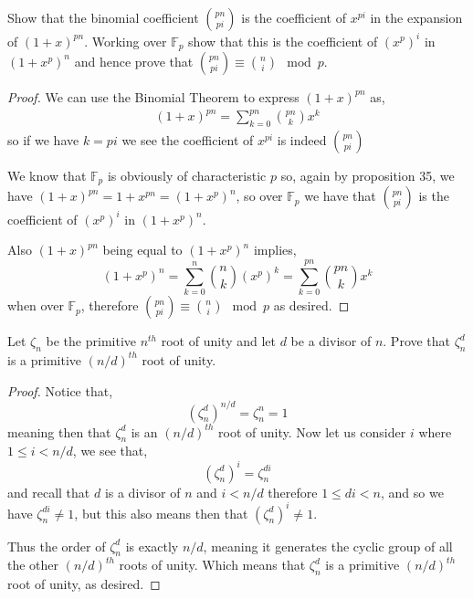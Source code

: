 \documentclass[11pt]{article}
\newenvironment{problem}[2][Problem\!]{\begin{trivlist}
\item[\hskip \labelsep {\bfseries #1}\hskip \labelsep {\bfseries #2}]}{\end{trivlist}}
\newcommand{\ff}{\mathbb F}   %
\renewcommand{\leq}{\leqslant}
\begin{document}
\newpage
\begin{tcolorbox}
    \begin{problem}{13.5.9}
        Show that the binomial coefficient $\binom{pn}{pi}$ is the coefficient of $x^{pi}$ in the expansion of $(1 + x)^{pn}$. Working over $\mathbb{F}_p$ show that this is the coefficient of $(x^{p})^{i}$ in $(1 + x^{p})^{n}$ and hence prove that $\binom{pn}{pi}\equiv \binom{n}{i} \mod{p}$. 
    \end{problem}
\end{tcolorbox}
\begin{proof}
    We can use the Binomial Theorem to express $(1+x)^{pn}$ as,
    \begin{align*}
        (1 + x)^{pn} = \sum_{k = 0}^{pn}\binom{pn}{k}x^{k}
    \end{align*}
    so if we have $k = pi$ we see the coefficient of $x^{pi}$ is indeed $\binom{pn}{pi}$

    We know that $\ff_p$ is obviously of characteristic $p$ so, again by proposition 35, we have $(1+x)^{pn} = 1+ x^{pn} = (1+ x^{p})^{n}$, so over $\ff_p$ we have that $\binom{pn}{pi}$ is the coefficient of $(x^{p})^{i}$ in $(1+x^{p})^{n}$. 

    Also $(1+x)^{pn} $ being equal to $(1+x^{p})^{n}$ implies,
    \[(1+x^{p})^{n} = \sum_{k = 0}^{n}\binom{n}{k}(x^{p})^{k} = \sum_{k = 0}^{pn}\binom{pn}{k}x^{k}\]
    when over $\ff_p$, therefore $\binom{pn}{pi} \equiv \binom{n}{i}\mod{p}$ as desired.
\end{proof}

\begin{tcolorbox}
    \begin{problem}{13.6.2}
        Let $\zeta_n$ be the primitive $n^{th}$ root of unity and let $d$ be a divisor of $n$. Prove that $\zeta_n^{d}$ is a primitive $(n/d)^{th}$ root of unity.
    \end{problem}
\end{tcolorbox}
\begin{proof}
    Notice that,
    \[(\zeta_n^{d})^{n/d} = \zeta_n^{n} =1\]
    meaning then that $\zeta_n^{d}$ is an $(n/d)^{th}$ root of unity. Now let us consider $i$ where $1\leq i < n/d$, we see that,
    \[(\zeta_n^{d})^{i} = \zeta_n^{di}\]
    and recall that $d$ is a divisor of $n$ and $i < n/d$ therefore $1 \leq di < n$, and so we have $\zeta_n^{di} \neq 1$, but this also means then that $(\zeta_n^{d})^{i}\neq 1$. 
    
    Thus the order of $\zeta_n^{d}$ is exactly $n/d$, meaning it generates the cyclic group of all the other $(n/d)^{th}$ roots of unity. Which means that $\zeta_n^{d}$ is a primitive $(n/d)^{th}$ root of unity, as desired.  
\end{proof}
\end{document}
